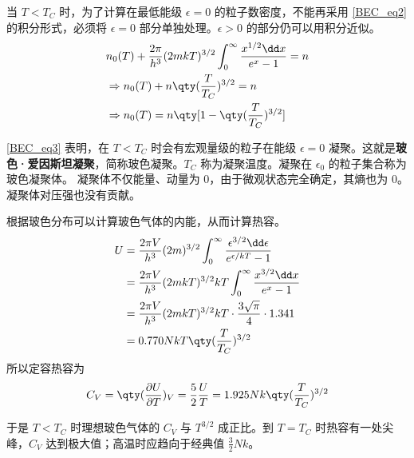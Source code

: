 当 $T<T_C$ 时，为了计算在最低能级 $\epsilon=0$ 的粒子数密度，不能再采用 \autoref{BEC_eq2} 的积分形式，必须将 $\epsilon=0$ 部分单独处理。$\epsilon>0$ 的部分仍可以用积分近似。
\begin{equation}\label{BEC_eq3}
\begin{aligned}
&n_0(T)+\frac{2\pi}{h^3}(2mkT)^{3/2}\int_0^\infty \frac{x^{1/2}\dd x}{e^x-1}=n\\
&\Rightarrow n_0(T)+n\qty(\frac{T}{T_C})^{3/2}=n\\
&\Rightarrow n_0(T)=n\qty[1-\qty(\frac{T}{T_C})^{3/2}]
\end{aligned}
\end{equation}

\autoref{BEC_eq3} 表明，在 $T<T_C$ 时会有宏观量级的粒子在能级 $\epsilon=0$ 凝聚。这就是\textbf{玻色·爱因斯坦凝聚}，简称玻色凝聚。$T_C$ 称为凝聚温度。凝聚在 $\epsilon_0$ 的粒子集合称为玻色凝聚体。 凝聚体不仅能量、动量为 $0$，由于微观状态完全确定，其熵也为 $0$。凝聚体对压强也没有贡献。

根据玻色分布可以计算玻色气体的内能，从而计算热容。
\begin{equation}
\begin{aligned}
U&=\frac{2\pi V}{h^3}(2m)^{3/2}\int_0^\infty \frac{\epsilon^{3/2}\dd \epsilon}{e^{\epsilon/kT}-1}\\
&=\frac{2\pi V}{h^3}(2mkT)^{3/2}kT\int_0^\infty \frac{x^{3/2}\dd x}{e^{x}-1}\\&=\frac{2\pi V}{h^3}(2mkT)^{3/2}kT\cdot \frac{3\sqrt{\pi}}{4}\cdot 1.341
\\
&=0.770NkT\qty(\frac{T}{T_C})^{3/2}
\end{aligned}
\end{equation}
所以定容热容为
\begin{equation}
C_V=\qty(\frac{\partial U}{\partial T})_V=\frac{5}{2}\frac{U}{T}=1.925Nk\qty(\frac{T}{T_C})^{3/2}
\end{equation}

于是 $T<T_C$ 时理想玻色气体的 $C_V$ 与 $T^{3/2}$ 成正比。到 $T=T_C$ 时热容有一处尖峰，$C_V$ 达到极大值；高温时应趋向于经典值 $\frac{3}{2}Nk$。